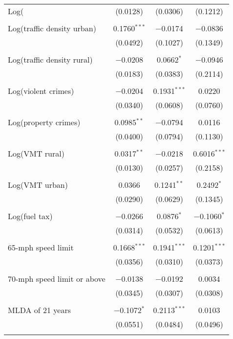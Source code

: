 \begin{table}[!htbp]
\begin{tabular}{@{\extracolsep{5pt}}lccc}
 Log(%
  & (0.0128) & (0.0306) & (0.1212) \\ 
  & & & \\ 
 Log(traffic density urban) & 0.1760$^{***}$ & $-$0.0174 & $-$0.0836 \\ 
  & (0.0492) & (0.1027) & (0.1349) \\ 
  & & & \\ 
 Log(traffic density rural) & $-$0.0208 & 0.0662$^{*}$ & $-$0.0946 \\ 
  & (0.0183) & (0.0383) & (0.2114) \\ 
  & & & \\ 
 Log(violent crimes) & $-$0.0204 & 0.1931$^{***}$ & 0.0220 \\ 
  & (0.0340) & (0.0608) & (0.0760) \\ 
  & & & \\ 
 Log(property crimes) & 0.0985$^{**}$ & $-$0.0794 & 0.0116 \\ 
  & (0.0400) & (0.0794) & (0.1130) \\ 
  & & & \\ 
 Log(VMT rural) & 0.0317$^{**}$ & $-$0.0218 & 0.6016$^{***}$ \\ 
  & (0.0130) & (0.0257) & (0.2158) \\ 
  & & & \\ 
 Log(VMT urban) & 0.0366 & 0.1241$^{**}$ & 0.2492$^{*}$ \\ 
  & (0.0290) & (0.0629) & (0.1345) \\ 
  & & & \\ 
 Log(fuel tax) & $-$0.0266 & 0.0876$^{*}$ & $-$0.1060$^{*}$ \\ 
  & (0.0314) & (0.0532) & (0.0613) \\ 
  & & & \\ 
 65-mph speed limit & 0.1668$^{***}$ & 0.1941$^{***}$ & 0.1201$^{***}$ \\ 
  & (0.0356) & (0.0310) & (0.0373) \\ 
  & & & \\ 
 70-mph speed limit or above & $-$0.0138 & $-$0.0192 & 0.0034 \\ 
  & (0.0345) & (0.0307) & (0.0308) \\ 
  & & & \\ 
 MLDA of 21 years & $-$0.1072$^{*}$ & 0.2113$^{***}$ & 0.0103 \\ 
  & (0.0551) & (0.0484) & (0.0496) \\ 
  & & & \\ 

\end{tabular}
\end{table}
